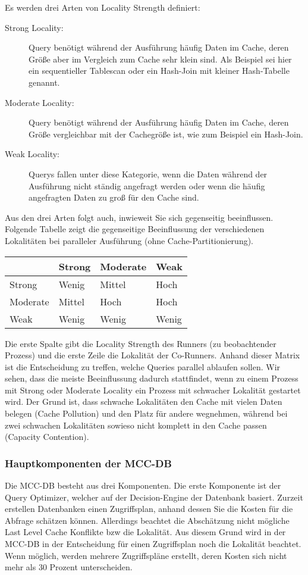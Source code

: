 Es werden drei Arten von Locality Strength definiert:
\begin{description}
\item[Strong Locality:] Query benötigt während der Ausführung häufig Daten im Cache, deren Größe aber im Vergleich zum Cache sehr klein sind. Als Beispiel sei hier ein sequentieller Tablescan oder ein Hash-Join mit kleiner Hash-Tabelle genannt. 
\item[Moderate Locality:] Query benötigt während der Ausführung häufig Daten im Cache, deren Größe vergleichbar mit der Cachegröße ist, wie zum Beispiel ein Hash-Join.
\item[Weak Locality:] Querys fallen unter diese Kategorie, wenn die Daten während der Ausführung nicht ständig angefragt werden oder wenn die häufig angefragten Daten zu groß für den Cache sind.
\end{description}

Aus den drei Arten folgt auch, inwieweit Sie sich gegenseitig beeinflussen. Folgende Tabelle zeigt die gegenseitige Beeinflussung der verschiedenen Lokalitäten bei paralleler Ausführung (ohne Cache-Partitionierung).\\
\begin{tabular}{|l|l|l|l|} \hline
 & Strong & Moderate & Weak \\ \hline
Strong & Wenig & Mittel & Hoch \\ \hline
Moderate & Mittel & Hoch & Hoch \\ \hline
Weak & Wenig & Wenig & Wenig \\ \hline
\end{tabular}

Die erste Spalte gibt die Locality Strength des Runners (zu beobachtender Prozess) und die erste Zeile die Lokalität der Co-Runners. Anhand dieser Matrix ist die Entscheidung zu treffen, welche Queries parallel ablaufen sollen. Wir sehen, dass die meiste Beeinflussung dadurch stattfindet, wenn zu einem Prozess mit Strong oder Moderate Locality ein Prozess mit schwacher Lokalität gestartet wird.
Der Grund ist, dass schwache Lokalitäten den Cache mit vielen Daten belegen (Cache Pollution) und den Platz für andere wegnehmen, während bei zwei schwachen Lokalitäten sowieso nicht komplett in den Cache passen (Capacity Contention).

\subsubsection*{Hauptkomponenten der MCC-DB}
Die MCC-DB besteht aus drei Komponenten. Die erste Komponente ist der Query Optimizer, welcher auf der Decision-Engine der Datenbank basiert. Zurzeit erstellen Datenbanken einen Zugriffsplan, anhand dessen Sie die Kosten für die Abfrage schätzen können. Allerdings beachtet die Abschätzung nicht mögliche Last Level Cache Konflikte bzw die Lokalität. Aus diesem Grund wird in der MCC-DB in der Entscheidung für einen Zugriffsplan noch die Lokalität beachtet. Wenn möglich, werden mehrere Zugriffspläne erstellt, deren Kosten sich nicht mehr als 30 Prozent unterscheiden.

